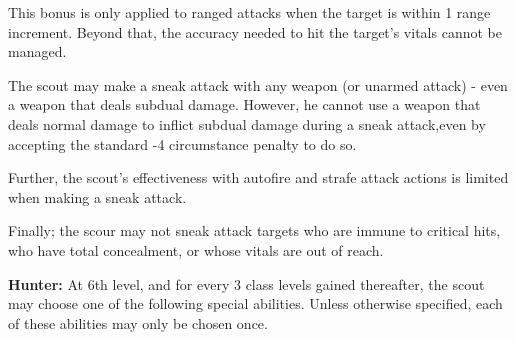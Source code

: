 This bonus is only applied to ranged attacks when the target is within 1 range increment. Beyond that, the accuracy needed to hit the target's vitals cannot be managed.

The scout may make a sneak attack with any weapon (or unarmed attack) - even a weapon that deals subdual damage. However, he cannot use a weapon that deals normal damage to inflict subdual damage during a sneak attack,even by accepting the standard -4 circumstance penalty to do so.

Further, the scout's effectiveness with autofire and strafe attack actions is limited when making a sneak attack.

Finally; the scour may not sneak attack targets who are immune to critical hits, who have total concealment, or whose vitals are out of reach.

\textbf{Hunter:} At 6th level, and for every 3 class levels gained thereafter, the scout may choose one of the following special abilities. Unless otherwise specified, each of these abilities may only be chosen once.

